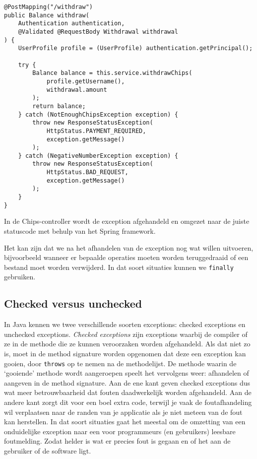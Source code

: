 \begin{listing}[H]
\begin{verbatim}
@PostMapping("/withdraw")
public Balance withdraw(
    Authentication authentication, 
    @Validated @RequestBody Withdrawal withdrawal
) {
    UserProfile profile = (UserProfile) authentication.getPrincipal();

    try {
        Balance balance = this.service.withdrawChips(
            profile.getUsername(), 
            withdrawal.amount
        );
        return balance;
    } catch (NotEnoughChipsException exception) {
        throw new ResponseStatusException(
            HttpStatus.PAYMENT_REQUIRED, 
            exception.getMessage()
        );
    } catch (NegativeNumberException exception) {
        throw new ResponseStatusException(
            HttpStatus.BAD_REQUEST, 
            exception.getMessage()
        );
    }
}
\end{verbatim}
\caption{In de Chips-controller wordt de exception afgehandeld 
en omgezet naar de juiste statuscode met behulp van het Spring framework.}
\label{code:chips-throw}
\end{listing}

Het kan zijn dat we na het afhandelen van de exception nog wat willen uitvoeren,
bijvoorbeeld wanneer er bepaalde operaties moeten worden teruggedraaid of een bestand 
moet worden verwijderd. In dat soort situaties kunnen we \texttt{finally} gebruiken.

\subsection{Checked versus unchecked}
In Java kennen we twee verschillende soorten exceptions: 
checked exceptions en unchecked exceptions.
\textit{Checked exceptions} zijn exceptions waarbij de compiler 
 of ze in de methode die ze kunnen veroorzaken worden afgehandeld.
Als dat niet zo is, moet in de method signature worden opgenomen dat deze 
een exception kan gooien, door \texttt{throws} op te nemen na de methodelijst.
De methode waarin de `gooiende' methode wordt aangeroepen speelt het vervolgens weer:
afhandelen of aangeven in de method signature. Aan de ene kant geven checked exceptions 
dus wat meer betrouwbaarheid dat fouten daadwerkelijk worden afgehandeld. Aan de andere kant 
zorgt dit voor een boel extra code, terwijl je vaak de foutafhandeling wil verplaatsen 
naar de randen van je applicatie als je niet meteen van de fout kan herstellen. 
In dat soort situaties gaat het meestal om de omzetting van een onduidelijke exception 
naar een voor programmeurs (en gebruikers) leesbare foutmelding. Zodat helder is 
wat er precies fout is gegaan en of het aan de gebruiker of de software ligt.

